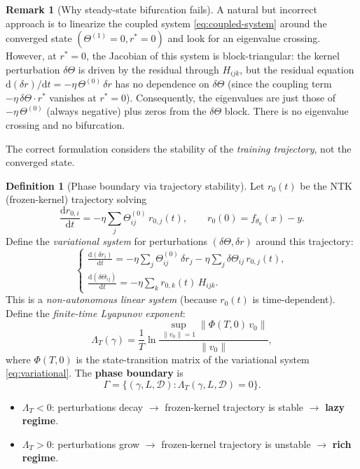 \documentclass[11pt]{article}
\theoremstyle{definition}
\newtheorem{definition}[theorem]{Definition}
\newtheorem{remark}[theorem]{Remark}
\newcommand{\cD}{\mathcal{D}}
\newcommand{\norm}[1]{\lVert #1 \rVert}
\newcommand{\dd}{\mathrm{d}}
\renewcommand{\Theta}{\varTheta}
\begin{document}
\begin{remark}[Why steady-state bifurcation fails]
A natural but incorrect approach is to linearize the coupled system \eqref{eq:coupled-system} around the converged state $(\Theta^{(1)} = 0, r^* = 0)$ and look for an eigenvalue crossing. However, at $r^* = 0$, the Jacobian of this system is block-triangular: the kernel perturbation $\delta\Theta$ is driven by the residual through $H_{ijk}$, but the residual equation $\dd(\delta r)/\dd t = -\eta\,\Theta^{(0)}\,\delta r$ has no dependence on $\delta\Theta$ (since the coupling term $-\eta\,\delta\Theta \cdot r^*$ vanishes at $r^* = 0$). Consequently, the eigenvalues are just those of $-\eta\,\Theta^{(0)}$ (always negative) plus zeros from the $\delta\Theta$ block. There is no eigenvalue crossing and no bifurcation.
\end{remark}

The correct formulation considers the stability of the \emph{training trajectory}, not the converged state.

\begin{definition}[Phase boundary via trajectory stability]
\label{def:phase-boundary}
Let $r_0(t)$ be the NTK (frozen-kernel) trajectory solving
\begin{equation}
\frac{\dd r_{0,i}}{\dd t} = -\eta \sum_j \Theta^{(0)}_{ij}\, r_{0,j}(t), \qquad r_0(0) = f_{\theta_0}(x) - y.
\end{equation}
Define the \emph{variational system} for perturbations $(\delta\Theta, \delta r)$ around this trajectory:
\begin{equation}
\label{eq:variational}
\begin{cases}
\displaystyle\frac{\dd(\delta r_i)}{\dd t} = -\eta \sum_j \Theta^{(0)}_{ij}\, \delta r_j - \eta \sum_j \delta\Theta_{ij}\, r_{0,j}(t), \\[10pt]
\displaystyle\frac{\dd(\delta\Theta_{ij})}{\dd t} = -\eta \sum_k r_{0,k}(t)\, H_{ijk}.
\end{cases}
\end{equation}
This is a \emph{non-autonomous linear system} (because $r_0(t)$ is time-dependent). Define the \emph{finite-time Lyapunov exponent}:
\begin{equation}
\label{eq:lyapunov}
\Lambda_T(\gamma) = \frac{1}{T} \ln \frac{\sup_{\norm{v_0}=1} \norm{\Phi(T,0)\, v_0}}{\norm{v_0}},
\end{equation}
where $\Phi(T,0)$ is the state-transition matrix of the variational system \eqref{eq:variational}. The \textbf{phase boundary} is
\begin{equation}
\Gamma = \{(\gamma, L, \cD) : \Lambda_T(\gamma, L, \cD) = 0\}.
\end{equation}
\begin{itemize}
\item $\Lambda_T < 0$: perturbations decay $\to$ frozen-kernel trajectory is stable $\to$ \textbf{lazy regime}.
\item $\Lambda_T > 0$: perturbations grow $\to$ frozen-kernel trajectory is unstable $\to$ \textbf{rich regime}.
\end{itemize}
\end{definition}
\end{document}
